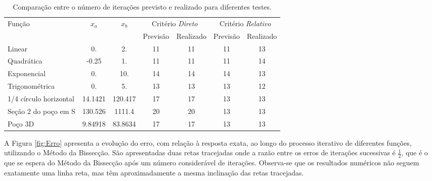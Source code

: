 \documentclass[final,5p]{elsarticle}
\numberwithin{equation}{section}
\begin{document}
    \begin{table} 
        \caption{Comparação entre o número de iterações previsto e realizado para diferentes testes.}
        \begin{tabular}{ l c c c c c c }
            \hline
            \multirow{2}{*}{Função} & \multirow{2}{*}{$x_a$} & \multirow{2}{*}{$x_b$} & \multicolumn{2}{c}{Critério \emph{Direto}} & \multicolumn{2}{c}{Critério \emph{Relativo}} \\
            &  &  & Previsão & Realizado & Previsão & Realizado \\
            \hline
            Linear & 0. & 2. & 11 & 11 & 11 & 13 \\
            Quadrática & -0.25 & 1. & 11 & 11 & 11 & 14 \\
            Exponencial & 0. & 10. & 14 & 14 & 14 & 13 \\
            Trigonométrica & 0. & 5. & 13 & 13 & 13 & 12 \\
            1/4 círculo horizontal & 14.1421 & 120.417 & 17 & 17 & 13 & 13 \\
            Seção 2 do poço em S & 130.526 & 1111.4 & 20 & 20 & 13 & 13 \\
            Poço 3D & 9.84918 & 83.8634 & 17 & 17 & 13 & 13 \\
            \hline
        \end{tabular}
        \label{table:iteracoes}
    \end{table}

    A Figura \ref{fig:Erro} apresenta a evolução do erro, com relação à resposta exata, ao longo do processo iterativo de diferentes funções, utilizando o Método da Bissecção. São apresentadas duas retas tracejadas onde a razão entre os erros de iterações sucessivas é $\frac{1}{2}$, que é o que se espera do Método da Bissecção após um número considerável de iterações. Observa-se que os resultados numéricos não seguem exatamente uma linha reta, mas têm aproximadamente a mesma inclinação das retas tracejadas.
\end{document}
